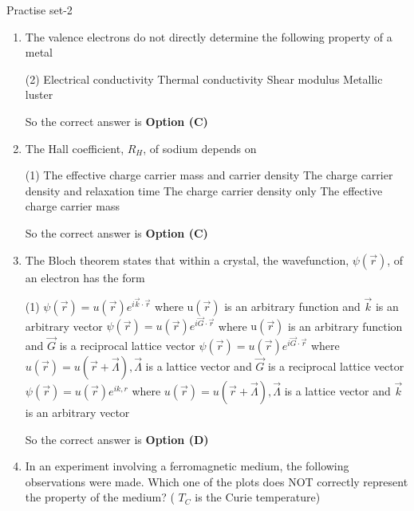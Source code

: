 \newpage
\begin{abox}
	Practise set-2
\end{abox}
\begin{enumerate}
	\item The valence electrons do not directly determine the following property of a metal
	{	}
	\begin{tasks}(2)
		\task[\textbf{A.}] Electrical conductivity
		\task[\textbf{B.}]  Thermal conductivity
		\task[\textbf{C.}] Shear modulus
		\task[\textbf{D.}] Metallic luster
	\end{tasks}
	\begin{answer}
		So the correct answer is \textbf{Option (C)}
	\end{answer}
	\item The Hall coefficient, $R_{H}$, of sodium depends on
	{	}
	\begin{tasks}(1)
		\task[\textbf{A.}]  The effective charge carrier mass and carrier density
		\task[\textbf{B.}] The charge carrier density and relaxation time
		\task[\textbf{C.}]  The charge carrier density only
		\task[\textbf{D.}] The effective charge carrier mass
	\end{tasks}
	\begin{answer}
		So the correct answer is \textbf{Option (C)}
	\end{answer}
	\item  The Bloch theorem states that within a crystal, the wavefunction, $\psi(\vec{r})$, of an electron has the form
	{	}
	\begin{tasks}(1)
		\task[\textbf{A.}]  $\psi(\vec{r})=u(\vec{r}) e^{i \vec{k} \cdot \vec{r}}$ where $\mathrm{u}(\vec{r})$ is an arbitrary function and $\vec{k}$ is an arbitrary vector
		\task[\textbf{B.}]  $\psi(\vec{r})=u(\vec{r}) e^{i \vec{G} \cdot \vec{r}}$ where $\mathrm{u}(\vec{r})$ is an arbitrary function and $\vec{G}$ is a reciprocal lattice vector
		\task[\textbf{C.}]  $\psi(\vec{r})=u(\vec{r}) e^{i \vec{G} \cdot \vec{r}}$ where $u(\vec{r})=u(\vec{r}+\vec{\Lambda}), \vec{\Lambda}$ is a lattice vector and $\vec{G}$ is a reciprocal lattice vector
		\task[\textbf{D.}]  $\psi(\vec{r})=u(\vec{r}) e^{i k, r}$ where $u(\vec{r})=u(\vec{r}+\vec{\Lambda}), \vec{\Lambda}$ is a lattice vector and $\vec{k}$ is an arbitrary vector
	\end{tasks}
	\begin{answer}
		So the correct answer is \textbf{Option (D)}
	\end{answer}
	\item In an experiment involving a ferromagnetic medium, the following observations were made. Which one of the plots does NOT correctly represent the property of the medium? ( $T_{C}$ is the Curie temperature)

\end{enumerate}
